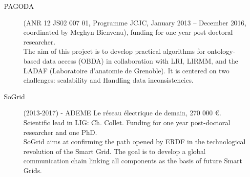 \begin{description}
\item[PAGODA] (ANR 12 JS02 007 01, Programme JCJC, January 2013 -- December 2016, coordinated by Meghyn Bienvenu), funding for one year post-doctoral researcher. \\
The aim of this project is to develop practical algorithms for ontology-based data access (OBDA) in collaboration with LRI, LIRMM, and the LADAF (Laboratoire d'anatomie de Grenoble). It is centered on two challenges: scalability and Handling data inconsistencies. 

\item[SoGrid]  (2013-2017) - ADEME Le r{\'e}seau  {\'e}lectrique de demain, 270 000 \euro. Scientific lead in LIG: Ch. Collet. Funding for one year post-doctoral researcher and one PhD. \\
SoGrid aims at confirming the path opened by ERDF in the technological revolution of the Smart Grid. The goal is to develop a global communication chain linking all components as the basis of future Smart Grids. 


\end{description}

